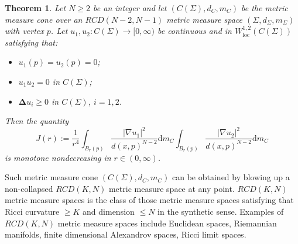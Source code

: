 \documentclass{article}
\newtheorem{theorem}{Theorem}[section]
\theoremstyle{remark}
\numberwithin{equation}{section}
\theoremstyle{definition}
\begin{document}
    \begin{theorem}\label{main_theorem}
    	Let $N \ge 2$ be an integer and let $(C(\Sigma),d_{C},m_{C})$ be the metric measure cone over an $RCD(N-2,N-1)$ metric measure space $(\Sigma,d_{\Sigma},m_{\Sigma})$ with vertex $p$. Let $u_{1},u_{2} : C(\Sigma) \to [0,\infty)$ be continuous and in $W^{1,2}_{\mathrm{loc}}(C(\Sigma))$ satisfying that:
    	\begin{itemize}
    		\item[(1)] $u_{1}(p) = u_{2}(p) = 0$;
    		\item[(2)] $u_{1} u_{2} = 0$ in $C(\Sigma)$;
    		\item[(3)] $\mathbf{\Delta} u_{i} \ge 0$ in $C(\Sigma)$, $i=1,2$.
    	\end{itemize}
        Then the quantity
        \begin{equation}
        	J(r) := \frac{1}{r^{4}} \int_{B_{r}(p)} \frac{\lvert \nabla u_{1} \rvert^{2}}{d(x,p)^{N-2}} \mathrm{d}m_{C} \int_{B_{r}(p)} \frac{\lvert \nabla u_{2} \rvert^{2}}{d(x,p)^{N-2}} \mathrm{d}m_{C}
        \end{equation}
        is monotone nondecreasing in $r \in (0,\infty)$.
    \end{theorem}
    Such metric measure cone $(C(\Sigma),d_{C},m_{C})$ can be obtained by blowing up a non-collapsed $RCD(K,N)$ metric measure space at any point. $RCD(K,N)$ metric measure spaces is the class of those metric measure spaces satisfying that Ricci curvature $\ge K$ and dimension $\le N$ in the synthetic sense. Examples of $RCD(K,N)$ metric measure spaces include Euclidean spaces, Riemannian manifolds, finite dimensional Alexandrov spaces, Ricci limit spaces.
    
\end{document}
